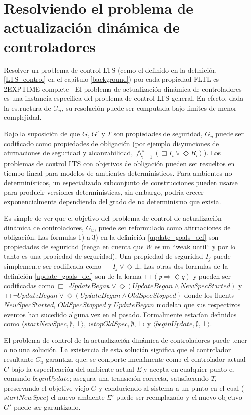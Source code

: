 \section{Resolviendo el problema de actualización dinámica de controladores}

Resolver un problema de control LTS (como el definido en la definición \ref{LTS_control} en el capítulo
\ref{background}) por cada propiedad FLTL es 2EXPTIME complete \cite{Pnueli:1989:SRM:75277.75293}. El problema de
actualización dinámica de controladores es una instancia especifica del problema de control LTS general. En efecto, dada
la estructura de $G_u$, su resolución puede ser computada bajo limites de menor complejidad.

Bajo la suposición de que $G$, $G'$ y $T$ son propiedades de seguridad, $G_u$ puede ser codificado como propiedades de
obligación (por ejemplo disyunciones de afirmaciones de seguridad y alcanzabilidad, $\bigwedge^n_{i=1}(\Box I_i \lor
\Diamond R_i)$). Los problemas de control LTS con objetivos de obligación pueden ser resueltos en tiempo lineal para
modelos de ambientes determinísticos. Para ambientes no determinísticos, un especializado subconjunto de construcciones
pueden usarse para producir versiones determinísticas, sin embargo, podría crecer exponencialmente dependiendo del grado
de no determinismo que exista.

Es simple de ver que el objetivo del problema de control de actualización dinámica de controladores, $G_u$, puede ser
reformulado como afirmaciones de obligación. Las formulas 1) a 3) en la definición \ref{update_goals_def} son propiedades
de seguridad (tenga en cuenta que $W$ es un ``weak until'' y por lo tanto es una propiedad de seguridad). Una propiedad
de seguridad $I_j$ puede simplemente ser codificada como $\Box I_j \lor \Diamond \bot$. Las otras dos formulas de la
definición \ref{update_goals_def} son de la forma $\Box(p \Longrightarrow \Diamond q)$ y pueden ser codificadas como
$\Box \neg UpdateBegan \lor \Diamond (UpdateBegan \wedge NewSpecStarted)$ y $\Box \neg UpdateBegan \lor \Diamond
(UpdateBegan \wedge OldSpecStopped)$ donde los fluents $NewSpecStarted$, $OldSpecStopped$ y $UpdateBegan$ modelan que sus
respectivos eventos han sucedido alguna vez en el pasado. Formalmente estarían definidos como $\langle{startNewSpec},
\emptyset, \bot \rangle$, $\langle{stopOldSpec}, \emptyset, \bot \rangle$ y $\langle{beginUpdate}, \emptyset, \bot
\rangle$.

El problema de control de la actualización dinámica de controladores puede tener o no una solución. La existencia de 
esta solución significa que el controlador resultante $C_u$ garantiza que: se comporte inicialmente como el controlador
actual $C$ bajo la especificación del ambiente actual $E$ y acepta en cualquier punto el comando $beginUpdate$; asegura
una transición correcta, satisfaciendo $T$, preservando el objetivo viejo $G$ y conduciendo al sistema a un punto en el
cual ($startNewSpec$) el nuevo ambiente $E'$ puede ser reemplazado y el nuevo objetivo $G'$ puede ser garantizado.

